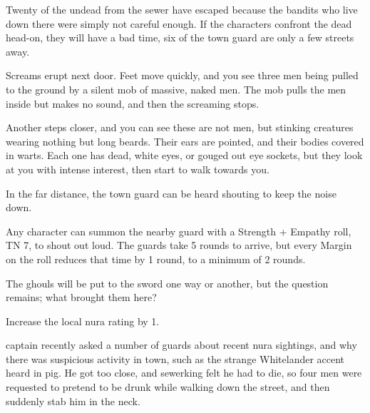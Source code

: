 \begin{multicols}{2}

Twenty of the undead from the sewer have escaped because the bandits who live down there were simply not careful enough.  If the characters confront the dead head-on, they will have a bad time, six of the town guard are only a few streets away.

\begin{boxtext}

	Screams erupt next door.
	Feet move quickly, and you see three men being pulled to the ground by a silent mob of massive, naked men.
	The mob pulls the men inside but makes no sound, and then the screaming stops.

	Another steps closer, and you can see these are not men, but stinking creatures wearing nothing but long beards.
	Their ears are pointed, and their bodies covered in warts.
	Each one has dead, white eyes, or gouged out eye sockets, but they look at you with intense interest, then start to walk towards you.

	In the far distance, the town guard can be heard shouting to keep the noise down.

\end{boxtext}

Any character can summon the nearby guard with a Strength + Empathy roll, TN 7, to shout out loud.
The guards take 5 rounds to arrive, but every Margin on the roll reduces that time by 1 round, to a minimum of 2 rounds.



The ghouls will be put to the sword one way or another, but the question remains; what brought them here?


Increase the local nura rating by 1.


\Gls{captain} recently asked a number of guards about recent nura sightings, and why there was suspicious activity in town, such as the strange Whitelander accent heard in \gls{pig}.
He got too close, and \gls{sewerking} felt he had to die, so four men were requested to pretend to be drunk while walking down the street, and then suddenly stab him in the neck.

\begin{boxtext}


\end{boxtext}
\end{multicols}
